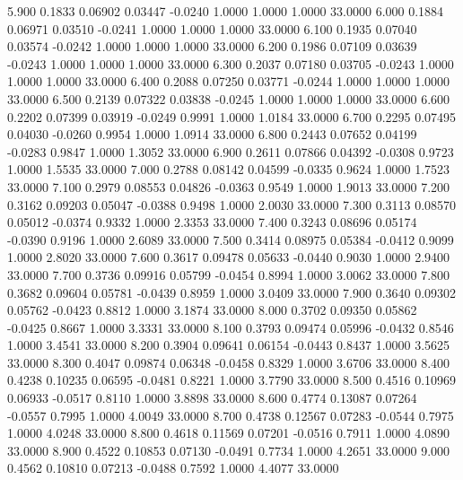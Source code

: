    5.900   0.1833   0.06902   0.03447  -0.0240   1.0000   1.0000   1.0000  33.0000
   6.000   0.1884   0.06971   0.03510  -0.0241   1.0000   1.0000   1.0000  33.0000
   6.100   0.1935   0.07040   0.03574  -0.0242   1.0000   1.0000   1.0000  33.0000
   6.200   0.1986   0.07109   0.03639  -0.0243   1.0000   1.0000   1.0000  33.0000
   6.300   0.2037   0.07180   0.03705  -0.0243   1.0000   1.0000   1.0000  33.0000
   6.400   0.2088   0.07250   0.03771  -0.0244   1.0000   1.0000   1.0000  33.0000
   6.500   0.2139   0.07322   0.03838  -0.0245   1.0000   1.0000   1.0000  33.0000
   6.600   0.2202   0.07399   0.03919  -0.0249   0.9991   1.0000   1.0184  33.0000
   6.700   0.2295   0.07495   0.04030  -0.0260   0.9954   1.0000   1.0914  33.0000
   6.800   0.2443   0.07652   0.04199  -0.0283   0.9847   1.0000   1.3052  33.0000
   6.900   0.2611   0.07866   0.04392  -0.0308   0.9723   1.0000   1.5535  33.0000
   7.000   0.2788   0.08142   0.04599  -0.0335   0.9624   1.0000   1.7523  33.0000
   7.100   0.2979   0.08553   0.04826  -0.0363   0.9549   1.0000   1.9013  33.0000
   7.200   0.3162   0.09203   0.05047  -0.0388   0.9498   1.0000   2.0030  33.0000
   7.300   0.3113   0.08570   0.05012  -0.0374   0.9332   1.0000   2.3353  33.0000
   7.400   0.3243   0.08696   0.05174  -0.0390   0.9196   1.0000   2.6089  33.0000
   7.500   0.3414   0.08975   0.05384  -0.0412   0.9099   1.0000   2.8020  33.0000
   7.600   0.3617   0.09478   0.05633  -0.0440   0.9030   1.0000   2.9400  33.0000
   7.700   0.3736   0.09916   0.05799  -0.0454   0.8994   1.0000   3.0062  33.0000
   7.800   0.3682   0.09604   0.05781  -0.0439   0.8959   1.0000   3.0409  33.0000
   7.900   0.3640   0.09302   0.05762  -0.0423   0.8812   1.0000   3.1874  33.0000
   8.000   0.3702   0.09350   0.05862  -0.0425   0.8667   1.0000   3.3331  33.0000
   8.100   0.3793   0.09474   0.05996  -0.0432   0.8546   1.0000   3.4541  33.0000
   8.200   0.3904   0.09641   0.06154  -0.0443   0.8437   1.0000   3.5625  33.0000
   8.300   0.4047   0.09874   0.06348  -0.0458   0.8329   1.0000   3.6706  33.0000
   8.400   0.4238   0.10235   0.06595  -0.0481   0.8221   1.0000   3.7790  33.0000
   8.500   0.4516   0.10969   0.06933  -0.0517   0.8110   1.0000   3.8898  33.0000
   8.600   0.4774   0.13087   0.07264  -0.0557   0.7995   1.0000   4.0049  33.0000
   8.700   0.4738   0.12567   0.07283  -0.0544   0.7975   1.0000   4.0248  33.0000
   8.800   0.4618   0.11569   0.07201  -0.0516   0.7911   1.0000   4.0890  33.0000
   8.900   0.4522   0.10853   0.07130  -0.0491   0.7734   1.0000   4.2651  33.0000
   9.000   0.4562   0.10810   0.07213  -0.0488   0.7592   1.0000   4.4077  33.0000
